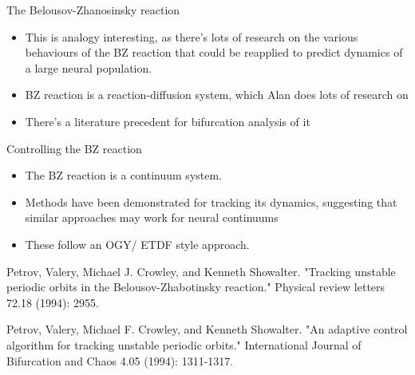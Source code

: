 \documentclass[presentation]{beamer}
\begin{document}
\begin{frame}[label={sec:orgafe5142}]{The Belousov-Zhanosinsky reaction}
\begin{itemize}
\item This is analogy interesting, as there's lots of research on the various behaviours of the BZ reaction that could be reapplied to predict dynamics of a large neural population.
\item BZ reaction is a reaction-diffusion system, which Alan does lots of research on
\item There's a literature precedent for bifurcation analysis of it
\end{itemize}
\end{frame}

\begin{frame}[label={sec:org6cc1897}]{Controlling the BZ reaction}
\begin{itemize}
\item The BZ reaction is a continuum system.
\item Methods have been demonstrated for tracking its dynamics, suggesting that similar approaches may work for neural continuums
\item These follow an OGY/ ETDF style approach.
\end{itemize}

Petrov, Valery, Michael J. Crowley, and Kenneth Showalter. "Tracking unstable periodic orbits in the Belousov-Zhabotinsky reaction." Physical review letters 72.18 (1994): 2955.

Petrov, Valery, Michael F. Crowley, and Kenneth Showalter. "An adaptive control algorithm for tracking unstable periodic orbits." International Journal of Bifurcation and Chaos 4.05 (1994): 1311-1317.
\end{frame}
\end{document}
